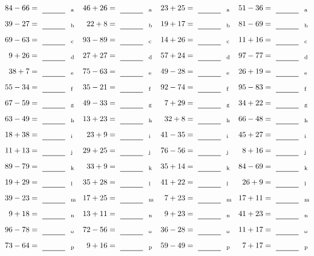\documentclass
[
  draft    = true,
  fontsize = 11pt,
  parskip  = half-
]
{scrartcl}
\begin{document}
\clearpage
\begin{align*}
    \pline{84-66}&=\rline{a}
  & \pline{46+26}&=\rline{a}
  & \pline{23+25}&=\rline{a}
  & \pline{51-36}&=\rline{a} \\[1ex]
    \pline{39-27}&=\rline{b}
  & \pline{22+8}&=\rline{b}
  & \pline{19+17}&=\rline{b}
  & \pline{81-69}&=\rline{b} \\[1ex]
    \pline{69-63}&=\rline{c}
  & \pline{93-89}&=\rline{c}
  & \pline{14+26}&=\rline{c}
  & \pline{11+16}&=\rline{c} \\[1ex]
    \pline{9+26}&=\rline{d}
  & \pline{27+27}&=\rline{d}
  & \pline{57+24}&=\rline{d}
  & \pline{97-77}&=\rline{d} \\[1ex]
    \pline{38+7}&=\rline{e}
  & \pline{75-63}&=\rline{e}
  & \pline{49-28}&=\rline{e}
  & \pline{26+19}&=\rline{e} \\[1ex]
    \pline{55-34}&=\rline{f}
  & \pline{35-21}&=\rline{f}
  & \pline{92-74}&=\rline{f}
  & \pline{95-83}&=\rline{f} \\[1ex]
    \pline{67-59}&=\rline{g}
  & \pline{49-33}&=\rline{g}
  & \pline{7+29}&=\rline{g}
  & \pline{34+22}&=\rline{g} \\[1ex]
    \pline{63-49}&=\rline{h}
  & \pline{13+23}&=\rline{h}
  & \pline{32+8}&=\rline{h}
  & \pline{66-48}&=\rline{h} \\[1ex]
    \pline{18+38}&=\rline{i}
  & \pline{23+9}&=\rline{i}
  & \pline{41-35}&=\rline{i}
  & \pline{45+27}&=\rline{i} \\[1ex]
    \pline{11+13}&=\rline{j}
  & \pline{29+25}&=\rline{j}
  & \pline{76-56}&=\rline{j}
  & \pline{8+16}&=\rline{j} \\[1ex]
    \pline{89-79}&=\rline{k}
  & \pline{33+9}&=\rline{k}
  & \pline{35+14}&=\rline{k}
  & \pline{84-69}&=\rline{k} \\[1ex]
    \pline{19+29}&=\rline{l}
  & \pline{35+28}&=\rline{l}
  & \pline{41+22}&=\rline{l}
  & \pline{26+9}&=\rline{l} \\[1ex]
    \pline{39-23}&=\rline{m}
  & \pline{17+25}&=\rline{m}
  & \pline{7+23}&=\rline{m}
  & \pline{17+11}&=\rline{m} \\[1ex]
    \pline{9+18}&=\rline{n}
  & \pline{13+11}&=\rline{n}
  & \pline{9+23}&=\rline{n}
  & \pline{41+23}&=\rline{n} \\[1ex]
    \pline{96-78}&=\rline{o}
  & \pline{72-56}&=\rline{o}
  & \pline{36-28}&=\rline{o}
  & \pline{11+17}&=\rline{o} \\[1ex]
    \pline{73-64}&=\rline{p}
  & \pline{9+16}&=\rline{p}
  & \pline{59-49}&=\rline{p}
  & \pline{7+17}&=\rline{p}
\end{align*}
\end{document}
